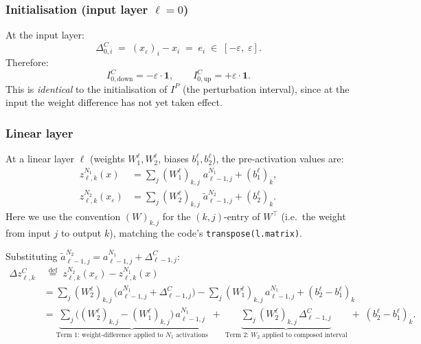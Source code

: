 \documentclass[11pt]{article}
\newcommand{\eps}{\varepsilon}
\newcommand{\layerl}{\ell}
\begin{document}
\subsubsection{Initialisation (input layer $\layerl = 0$)}

At the input layer:
\begin{equation}
    \Delta^C_{0,i}
    \;=\; (x_\varepsilon)_i - x_i
    \;=\; e_i
    \;\in\; [-\eps,\; \eps].
\end{equation}
Therefore:
\begin{equation}
    \boxed{I^C_{0,\mathrm{down}} = -\eps\cdot\mathbf{1},
    \qquad
    I^C_{0,\mathrm{up}} = +\eps\cdot\mathbf{1}.}
    \label{eq:ic_init}
\end{equation}
This is \emph{identical} to the initialisation of $I^P$ (the perturbation
interval), since at the input the weight difference has not yet taken effect.

\subsubsection{Linear layer}

At a linear layer $\layerl$ (weights $W_1^\layerl, W_2^\layerl$, biases $b_1^\layerl, b_2^\layerl$),
the pre-activation values are:
\begin{align}
    z^{N_1}_{\layerl,k}(x) &= \sum_j (W_1^\layerl)_{k,j}\; a^{N_1}_{\layerl-1,j} + (b_1^\layerl)_k, \\
    z^{N_2}_{\layerl,k}(x_\varepsilon) &= \sum_j (W_2^\layerl)_{k,j}\; \tilde{a}^{N_2}_{\layerl-1,j} + (b_2^\layerl)_k.
\end{align}
Here we use the convention $(W)_{k,j}$ for the $(k,j)$-entry of $W^\top$
(i.e.\ the weight from input $j$ to output $k$), matching the code's
\texttt{transpose(l.matrix)}.

Substituting $\tilde{a}^{N_2}_{\layerl-1,j} = a^{N_1}_{\layerl-1,j} + \Delta^C_{\layerl-1,j}$:
\begin{align}
    \Delta z^C_{\layerl,k}
    &\;\stackrel{\text{def}}{=}\;
    z^{N_2}_{\layerl,k}(x_\varepsilon) - z^{N_1}_{\layerl,k}(x) \nonumber\\[4pt]
    &= \sum_j (W_2^\layerl)_{k,j}\,\bigl(a^{N_1}_{\layerl-1,j} + \Delta^C_{\layerl-1,j}\bigr)
       - \sum_j (W_1^\layerl)_{k,j}\, a^{N_1}_{\layerl-1,j}
       + (b_2^\layerl - b_1^\layerl)_k \nonumber\\[4pt]
    &= \underbrace{\sum_j \bigl((W_2^\layerl)_{k,j} - (W_1^\layerl)_{k,j}\bigr)\, a^{N_1}_{\layerl-1,j}}_{\text{Term 1: weight-difference applied to } N_1 \text{ activations}}
    \;+\;
    \underbrace{\sum_j (W_2^\layerl)_{k,j}\, \Delta^C_{\layerl-1,j}}_{\text{Term 2: } W_2 \text{ applied to composed interval}}
    \;+\; (b_2^\layerl - b_1^\layerl)_k.
    \label{eq:ic_linear}
\end{align}
\end{document}
